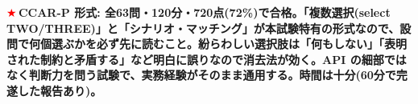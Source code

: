 \documentclass[10pt,a4paper]{article}
\newcommand{\R}[1]{\textcolor{cred}{\textbf{#1}}}
\newcommand{\B}[1]{\textcolor{cblue}{\textbf{#1}}}
\newcommand{\stc}{\textcolor{red}{\ensuremath{\bigstar}}\,}
\begin{document}
\footnotesize

\begin{tcolorbox}[enhanced,colback=cpurple,colframe=cpurple,boxrule=0.8pt,arc=2pt,
  left=5pt,right=5pt,top=1pt,bottom=1pt,before skip=0pt,after skip=1pt]
{\scriptsize\bfseries\color{white} \stc CCAR-P 形式: 全63問・120分・720点(72\%)で合格。「複数選択(select TWO/THREE)」と「シナリオ・マッチング」が本試験特有の形式なので、設問で\B{何個選ぶか}を必ず先に読むこと。紛らわしい選択肢は「何もしない」「表明された制約と矛盾する」など\R{明白に誤り}なので\B{消去法}が効く。API の細部ではなく判断力を問う試験で、実務経験がそのまま通用する。時間は十分(60分で完遂した報告あり)。}
\end{tcolorbox}

\noindent
\end{document}
